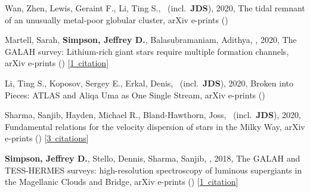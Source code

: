 \item[{\color{numcolor}\scriptsize5}] Wan, Zhen, Lewis, Geraint F., Li, Ting S., \etal\ (incl.\ \textbf{JDS}), 2020, The tidal remnant of an unusually metal-poor globular cluster, arXiv e-prints ()

\item[{\color{numcolor}\scriptsize4}] Martell, Sarah, \textbf{Simpson, Jeffrey D.}, Balasubramaniam, Adithya, \etal, 2020, The GALAH survey: Lithium-rich giant stars require multiple formation channels, arXiv e-prints () [\href{https://ui.adsabs.harvard.edu/#abs/2020arXiv200602106M}{1~citation}]

\item[{\color{numcolor}\scriptsize3}] Li, Ting S., Koposov, Sergey E., Erkal, Denis, \etal\ (incl.\ \textbf{JDS}), 2020, Broken into Pieces: ATLAS and Aliqa Uma as One Single Stream, arXiv e-prints ()

\item[{\color{numcolor}\scriptsize2}] Sharma, Sanjib, Hayden, Michael R., Bland-Hawthorn, Joss, \etal\ (incl.\ \textbf{JDS}), 2020, Fundamental relations for the velocity dispersion of stars in the Milky Way, arXiv e-prints () [\href{https://ui.adsabs.harvard.edu/#abs/2020arXiv200406556S}{3~citations}]

\item[{\color{numcolor}\scriptsize1}] \textbf{Simpson, Jeffrey D.}, Stello, Dennis, Sharma, Sanjib, \etal, 2018, The GALAH and TESS-HERMES surveys: high-resolution spectroscopy of luminous supergiants in the Magellanic Clouds and Bridge, arXiv e-prints () [\href{https://ui.adsabs.harvard.edu/#abs/2018arXiv180405900S}{1~citation}]